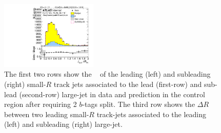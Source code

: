\begin{figure}[htb!]
\begin{center}
\includegraphics[width=0.41\textwidth,angle=-90]{figures/boosted/Control/b77_TwoTag_split_Control_sublHCand_trk_dr.pdf}
  \caption{The first two rows show the \pt~ of the leading (left) and subleading (right) small-$R$ track jets associated to the lead (first-row) and sub-lead (second-row) large-\R jet in data and prediction in the control region after requiring 2 $b$-tags split. The third row shows the $\Delta R$ between two leading small-$R$ track-jets associated to the leading (left) and subleading (right) large-\R jet.  }
  \label{fig:boosted-2bs-control-ak2}
\end{center}
\end{figure}


